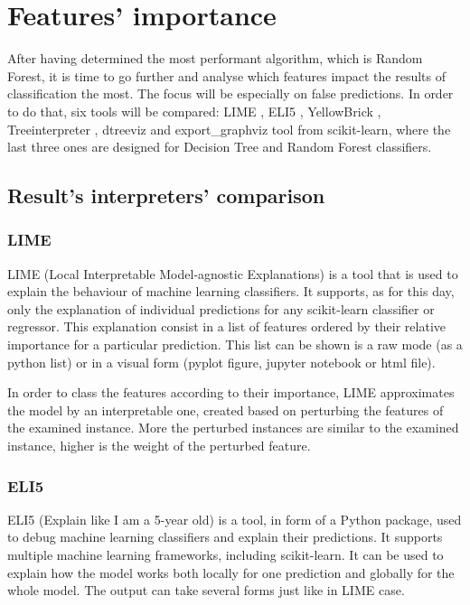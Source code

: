 \chapter{Features' importance}

After having determined the most performant algorithm, which is Random Forest, it is time to go further and analyse which features impact the results of classification the most. The focus will be especially on false predictions. In order to do that, six tools will be compared: LIME \cite{lime}, ELI5 \cite{mikhail_korobov_eli5_nodate}, YellowBrick \cite{bengfort_yellowbrick_2018}, Treeinterpreter \cite{ando_saabas_treeinterpreter_nodate}, dtreeviz \cite{terence_parr_dtreeviz_nodate} and export\_graphviz tool from scikit-learn, where the last three ones are designed for Decision Tree and Random Forest classifiers.

\section{Result's interpreters' comparison}
\subsection{LIME}
LIME (Local Interpretable Model-agnostic Explanations) is a tool that is used to explain the behaviour of machine learning classifiers. It supports, as for this day, only the explanation of individual predictions for any scikit-learn classifier or regressor. This explanation consist in a list of features ordered by their relative importance for a particular prediction. This list can be shown is a raw mode (as a python list) or in a visual form (pyplot figure, jupyter notebook or html file).

In order to class the features according to their importance, LIME approximates the model by an interpretable one, created based on perturbing the features of the examined instance. More the perturbed instances are similar to the examined instance, higher is the weight of the perturbed feature.

\subsection{ELI5}
ELI5 (Explain like I am a 5-year old) is a tool, in form of a Python package, used to debug machine learning classifiers and explain their predictions. It supports multiple machine learning frameworks, including scikit-learn. It can be used to explain how the model works both locally for one prediction and globally for the whole model. The output can take several forms just like in LIME case.

